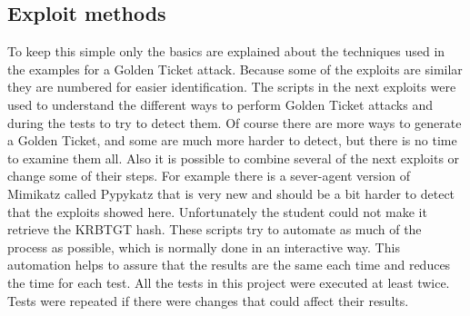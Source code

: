 \subsection{Exploit methods}
To keep this simple only the basics are explained about the techniques used in the examples for a Golden Ticket attack. Because some of the exploits are similar they are numbered for easier identification. The scripts in the next exploits were used to understand the different ways to perform Golden Ticket attacks and during the tests to try to detect them. Of course there are more ways to generate a Golden Ticket, and some are much more harder to detect, but there is no time to examine them all. Also it is possible to combine several of the next exploits or change some of their steps.
\linej
For example there is a sever-agent version of Mimikatz called Pypykatz\cite{pypykatz_agent}\cite{pypykatz_server} that is very new and should be a bit harder to detect that the exploits showed here. Unfortunately the student could not make it retrieve the KRBTGT hash.
\linej
\linej
These scripts try to automate as much of the process as possible, which is normally done in an interactive way. This automation helps to assure that the results are the same each time and reduces the time for each test. All the tests in this project were executed at least twice. Tests were repeated if there were changes that could affect their results.

